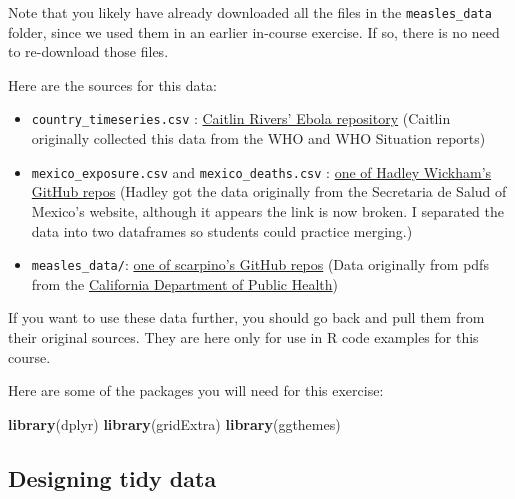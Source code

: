 \documentclass[]{book}
\makeatletter
\newenvironment{Shaded}{\begin{snugshade}}{\end{snugshade}}
\newcommand{\KeywordTok}[1]{\textcolor[rgb]{0.13,0.29,0.53}{\textbf{#1}}}
\newcommand{\NormalTok}[1]{#1}
\providecommand{\tightlist}{%
  \setlength{\itemsep}{0pt}\setlength{\parskip}{0pt}}
\newenvironment{kframe}{%
\medskip{}
\setlength{\fboxsep}{.8em}
 \def\at@end@of@kframe{}%
 \ifinner\ifhmode%
  \def\at@end@of@kframe{\end{minipage}}%
  \begin{minipage}{\columnwidth}%
 \fi\fi%
 \def\FrameCommand##1{\hskip\@totalleftmargin \hskip-\fboxsep
 \colorbox{shadecolor}{##1}\hskip-\fboxsep
     \hskip-\linewidth \hskip-\@totalleftmargin \hskip\columnwidth}%
 \MakeFramed {\advance\hsize-\width
   \@totalleftmargin\z@ \linewidth\hsize
   \@setminipage}}%
 {\par\unskip\endMakeFramed%
 \at@end@of@kframe}
\renewenvironment{Shaded}{\begin{kframe}}{\end{kframe}}
\newenvironment{rmdblock}[1]
  {
  \begin{itemize}
  \renewcommand{\labelitemi}{
    \raisebox{-.7\height}[0pt][0pt]{
      {\setkeys{Gin}{width=3em,keepaspectratio}\texttt{[image: images/\#1]}}
    }
  }
  \setlength{\fboxsep}{1em}
  \begin{kframe}
  \item
  }
  {
  \end{kframe}
  \end{itemize}
  }
\newenvironment{rmdwarning}
  {\begin{rmdblock}{warning}}
  {\end{rmdblock}}
\theoremstyle{definition}
\theoremstyle{definition}
\theoremstyle{definition}
\theoremstyle{remark}
\makeatother
\begin{document}
Note that you likely have already downloaded all the files in the
\texttt{measles\_data} folder, since we used them in an earlier
in-course exercise. If so, there is no need to re-download those files.

Here are the sources for this data:

\begin{itemize}
\tightlist
\item
  \texttt{country\_timeseries.csv} :
  \href{https://github.com/cmrivers/ebola}{Caitlin Rivers' Ebola
  repository} (Caitlin originally collected this data from the WHO and
  WHO Situation reports)
\item
  \texttt{mexico\_exposure.csv} and \texttt{mexico\_deaths.csv} :
  \href{https://github.com/hadley/mexico-mortality/tree/master/disease}{one
  of Hadley Wickham's GitHub repos} (Hadley got the data originally from
  the Secretaria de Salud of Mexico's website, although it appears the
  link is now broken. I separated the data into two dataframes so
  students could practice merging.)
\item
  \texttt{measles\_data/}:
  \href{https://github.com/scarpino/measles-CA-2015}{one of scarpino's
  GitHub repos} (Data originally from pdfs from the
  \href{https://www.cdph.ca.gov/HealthInfo/discond/Pages/MeaslesSurveillanceUpdates.aspx}{California
  Department of Public Health})
\end{itemize}

\begin{rmdwarning}
If you want to use these data further, you should go back and pull them
from their original sources. They are here only for use in R code
examples for this course.
\end{rmdwarning}

Here are some of the packages you will need for this exercise:

\begin{Shaded}
\begin{Highlighting}[]
\KeywordTok{library}\NormalTok{(dplyr)}
\KeywordTok{library}\NormalTok{(gridExtra)}
\KeywordTok{library}\NormalTok{(ggthemes)}
\end{Highlighting}
\end{Shaded}

\subsection{Designing tidy data}\label{designing-tidy-data}
\end{document}
